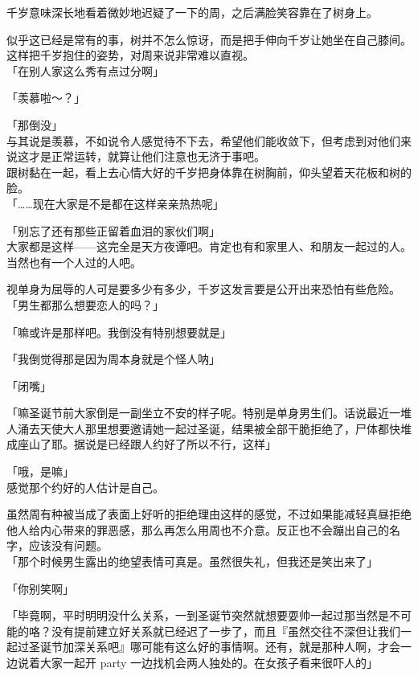 千岁意味深长地看着微妙地迟疑了一下的周，之后满脸笑容靠在了树身上。

似乎这已经是常有的事，树并不怎么惊讶，而是把手伸向千岁让她坐在自己膝间。这样把千岁抱住的姿势，对周来说非常难以直视。\\

「在别人家这么秀有点过分啊」

「羡慕啦～？」

「那倒没」\\

与其说是羡慕，不如说令人感觉待不下去，希望他们能收敛下，但考虑到对他们来说这才是正常运转，就算让他们注意也无济于事吧。\\

跟树黏在一起，看上去心情大好的千岁把身体靠在树胸前，仰头望着天花板和树的脸。\\

「……现在大家是不是都在这样亲亲热热呢」

「别忘了还有那些正留着血泪的家伙们啊」\\

大家都是这样——这完全是天方夜谭吧。肯定也有和家里人、和朋友一起过的人。当然也有一个人过的人吧。

视单身为屈辱的人可是要多少有多少，千岁这发言要是公开出来恐怕有些危险。\\

「男生都那么想要恋人的吗？」

「嘛或许是那样吧。我倒没有特别想要就是」

「我倒觉得那是因为周本身就是个怪人呐」

「闭嘴」

「嘛圣诞节前大家倒是一副坐立不安的样子呢。特别是单身男生们。话说最近一堆人涌去天使大人那里想要邀请她一起过圣诞，结果被全部干脆拒绝了，尸体都快堆成座山了耶。据说是已经跟人约好了所以不行，这样」

「哦，是嘛」\\

感觉那个约好的人估计是自己。

虽然周有种被当成了表面上好听的拒绝理由这样的感觉，不过如果能减轻真昼拒绝他人给内心带来的罪恶感，那么再怎么用周也不介意。反正也不会蹦出自己的名字，应该没有问题。\\

「那个时候男生露出的绝望表情可真是。虽然很失礼，但我还是笑出来了」

「你别笑啊」

「毕竟啊，平时明明没什么关系，一到圣诞节突然就想要耍帅一起过那当然是不可能的咯？没有提前建立好关系就已经迟了一步了，而且『虽然交往不深但让我们一起过圣诞节加深关系吧』哪可能有这么好的事情啊。还有，就是那种人啊，才会一边说着大家一起开 party 一边找机会两人独处的。在女孩子看来很吓人的」\\

